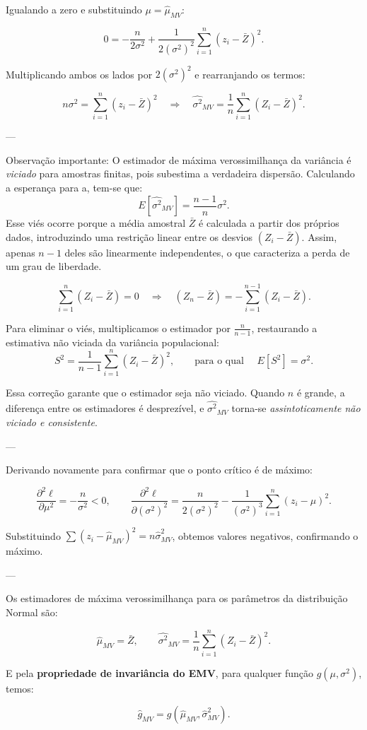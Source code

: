 Igualando a zero e substituindo $\mu = \widehat{\mu}_{MV}$:

\[
0 = -\frac{n}{2\sigma^2}
+ \frac{1}{2(\sigma^2)^2}\sum_{i=1}^n (z_i-\bar{Z})^2.
\]

Multiplicando ambos os lados por $2(\sigma^2)^2$ e rearranjando os termos:

\[
n\sigma^2 = \sum_{i=1}^n (z_i-\bar{Z})^2
\quad\Longrightarrow\quad
\boxed{
\widehat{\sigma^2}_{MV} = \frac{1}{n}\sum_{i=1}^n (Z_i - \bar{Z})^2.
}
\]

---

\noindent
Observação importante: O estimador de máxima verossimilhança da variância é \textit{viciado} para amostras finitas, pois subestima a verdadeira dispersão.  
Calculando a esperança para a, tem-se que:
\[
E[\widehat{\sigma^2}_{MV}] = \frac{n-1}{n}\sigma^2.
\]
Esse viés ocorre porque a média amostral $\bar{Z}$ é calculada a partir dos próprios dados, introduzindo uma restrição linear entre os desvios $(Z_i - \bar{Z})$.  
Assim, apenas $n - 1$ deles são linearmente independentes, o que caracteriza a perda de um grau de liberdade.

\[
\sum_{i=1}^{n}(Z_i - \bar{Z}) = 0 \quad \Longrightarrow \quad (Z_n - \bar{Z}) = -\sum_{i=1}^{n-1}(Z_i - \bar{Z}).
\]

Para eliminar o viés, multiplicamos o estimador por $\tfrac{n}{n-1}$,  
restaurando a estimativa não viciada da variância populacional:
\[
S^2 = \frac{1}{n-1}\sum_{i=1}^{n}(Z_i - \bar{Z})^2, 
\qquad \text{para o qual } \quad E[S^2] = \sigma^2.
\]

Essa correção garante que o estimador seja não viciado.  
Quando $n$ é grande, a diferença entre os estimadores é desprezível,  
e $\widehat{\sigma^2}_{MV}$ torna-se \textit{assintoticamente não viciado e consistente}.

---

Derivando novamente para confirmar que o ponto crítico é de máximo:

\[
\frac{\partial^2 \ell}{\partial \mu^2} = -\frac{n}{\sigma^2} < 0,
\qquad
\frac{\partial^2 \ell}{\partial(\sigma^2)^2}
= \frac{n}{2(\sigma^2)^2} - \frac{1}{(\sigma^2)^3}\sum_{i=1}^n (z_i-\mu)^2.
\]

Substituindo $\sum (z_i-\widehat\mu_{MV})^2 = n\widehat\sigma^2_{MV}$, obtemos valores negativos, confirmando o máximo.

---
 
Os estimadores de máxima verossimilhança para os parâmetros da distribuição Normal são:

\[
\boxed{
\widehat\mu_{MV} = \bar{Z},
\qquad
\widehat{\sigma^2}_{MV} = \frac{1}{n}\sum_{i=1}^n (Z_i - \bar{Z})^2.
}
\]

E pela \textbf{propriedade de invariância do EMV}, para qualquer função $g(\mu,\sigma^2)$, temos:

\[
\boxed{
\widehat{g}_{MV} = g(\widehat\mu_{MV}, \widehat\sigma^2_{MV}).
}
\]